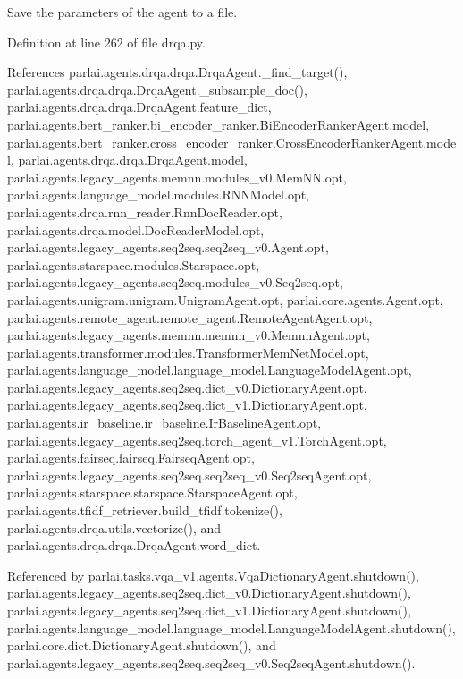 \begin{DoxyVerb}Save the parameters of the agent to a file.\end{DoxyVerb}
 

Definition at line 262 of file drqa.\+py.



References parlai.\+agents.\+drqa.\+drqa.\+Drqa\+Agent.\+\_\+find\+\_\+target(), parlai.\+agents.\+drqa.\+drqa.\+Drqa\+Agent.\+\_\+subsample\+\_\+doc(), parlai.\+agents.\+drqa.\+drqa.\+Drqa\+Agent.\+feature\+\_\+dict, parlai.\+agents.\+bert\+\_\+ranker.\+bi\+\_\+encoder\+\_\+ranker.\+Bi\+Encoder\+Ranker\+Agent.\+model, parlai.\+agents.\+bert\+\_\+ranker.\+cross\+\_\+encoder\+\_\+ranker.\+Cross\+Encoder\+Ranker\+Agent.\+model, parlai.\+agents.\+drqa.\+drqa.\+Drqa\+Agent.\+model, parlai.\+agents.\+legacy\+\_\+agents.\+memnn.\+modules\+\_\+v0.\+Mem\+N\+N.\+opt, parlai.\+agents.\+language\+\_\+model.\+modules.\+R\+N\+N\+Model.\+opt, parlai.\+agents.\+drqa.\+rnn\+\_\+reader.\+Rnn\+Doc\+Reader.\+opt, parlai.\+agents.\+drqa.\+model.\+Doc\+Reader\+Model.\+opt, parlai.\+agents.\+legacy\+\_\+agents.\+seq2seq.\+seq2seq\+\_\+v0.\+Agent.\+opt, parlai.\+agents.\+starspace.\+modules.\+Starspace.\+opt, parlai.\+agents.\+legacy\+\_\+agents.\+seq2seq.\+modules\+\_\+v0.\+Seq2seq.\+opt, parlai.\+agents.\+unigram.\+unigram.\+Unigram\+Agent.\+opt, parlai.\+core.\+agents.\+Agent.\+opt, parlai.\+agents.\+remote\+\_\+agent.\+remote\+\_\+agent.\+Remote\+Agent\+Agent.\+opt, parlai.\+agents.\+legacy\+\_\+agents.\+memnn.\+memnn\+\_\+v0.\+Memnn\+Agent.\+opt, parlai.\+agents.\+transformer.\+modules.\+Transformer\+Mem\+Net\+Model.\+opt, parlai.\+agents.\+language\+\_\+model.\+language\+\_\+model.\+Language\+Model\+Agent.\+opt, parlai.\+agents.\+legacy\+\_\+agents.\+seq2seq.\+dict\+\_\+v0.\+Dictionary\+Agent.\+opt, parlai.\+agents.\+legacy\+\_\+agents.\+seq2seq.\+dict\+\_\+v1.\+Dictionary\+Agent.\+opt, parlai.\+agents.\+ir\+\_\+baseline.\+ir\+\_\+baseline.\+Ir\+Baseline\+Agent.\+opt, parlai.\+agents.\+legacy\+\_\+agents.\+seq2seq.\+torch\+\_\+agent\+\_\+v1.\+Torch\+Agent.\+opt, parlai.\+agents.\+fairseq.\+fairseq.\+Fairseq\+Agent.\+opt, parlai.\+agents.\+legacy\+\_\+agents.\+seq2seq.\+seq2seq\+\_\+v0.\+Seq2seq\+Agent.\+opt, parlai.\+agents.\+starspace.\+starspace.\+Starspace\+Agent.\+opt, parlai.\+agents.\+tfidf\+\_\+retriever.\+build\+\_\+tfidf.\+tokenize(), parlai.\+agents.\+drqa.\+utils.\+vectorize(), and parlai.\+agents.\+drqa.\+drqa.\+Drqa\+Agent.\+word\+\_\+dict.



Referenced by parlai.\+tasks.\+vqa\+\_\+v1.\+agents.\+Vqa\+Dictionary\+Agent.\+shutdown(), parlai.\+agents.\+legacy\+\_\+agents.\+seq2seq.\+dict\+\_\+v0.\+Dictionary\+Agent.\+shutdown(), parlai.\+agents.\+legacy\+\_\+agents.\+seq2seq.\+dict\+\_\+v1.\+Dictionary\+Agent.\+shutdown(), parlai.\+agents.\+language\+\_\+model.\+language\+\_\+model.\+Language\+Model\+Agent.\+shutdown(), parlai.\+core.\+dict.\+Dictionary\+Agent.\+shutdown(), and parlai.\+agents.\+legacy\+\_\+agents.\+seq2seq.\+seq2seq\+\_\+v0.\+Seq2seq\+Agent.\+shutdown().

